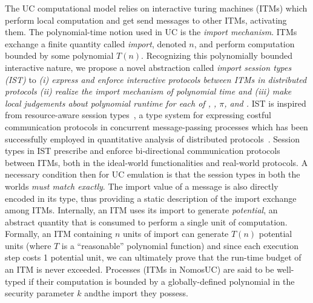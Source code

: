 The UC computational model relies on interactive turing machines (ITMs) which perform local computation and get send messages to other ITMs, activating them.
The polynomial-time notion used in UC is the \emph{import mechanism}. ITMs exchange a finite quantity called \emph{import}, denoted $n$, and perform computation bounded by some polynomial $T(n)$.
Recognizing this polynomially bounded interactive nature, we propose a novel abstraction called \emph{import session types (IST)} to \emph{(i) express and enforce interactive protocols between ITMs in distributed protocols (ii) realize the import mechanism of polynomial time and (iii) make local judgements about polynomial runtime for each of \A, \F, $\pi$, and \Z.} 
IST is inspired from resource-aware session types~\cite{das2018work}, a type system for expressing costful communication protocols
in concurrent message-passing processes which has been successfully employed in quantitative analysis of distributed
protocols~\cite{dasnomos,Das20FSCD,Das22LMCS,Das20arxiv}.
Session types in IST prescribe and enforce bi-directional communication protocols between ITMs, both in the ideal-world functionalities and real-world protocols.
A necessary condition then for UC emulation is that the session types in both the worlds \emph{must match exactly}.
The import value of a message is also directly encoded in its type, thus providing a static description of the import exchange
among ITMs.
Internally, an ITM uses its import to generate \emph{potential}, an abstract quantity that is consumed to perform a single
unit of computation.
Formally, an ITM containing $n$ units of import can generate $T(n)$ potential units (where $T$ is a ``reasonable'' polynomial function)
and since each execution step costs 1 potential unit, we can ultimately prove that the run-time budget of an ITM is never exceeded.
Processes (ITMs in NomosUC) are said to be well-typed if their computation is bounded by a globally-defined polynomial in the security parameter $k$ andthe import they possess.

